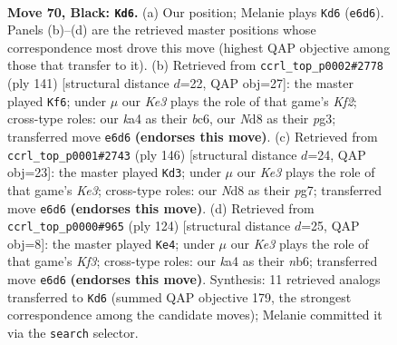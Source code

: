 \documentclass[11pt]{article}
\begin{document}
\clearpage

\begin{figure}[p]\centering
\begin{subfigure}{0.46\textwidth}\centering
\resizebox{\linewidth}{!}{%
\newchessgame
\chessboard[
  setfen={3n4/6p1/1p2k1p1/p1pp4/K7/1PP5/8/8 b - - 4 70},
  showmover=false,
  pgfstyle=straightmove, color=movearrow, markmove={e6-d6}
]}
\caption{}
\end{subfigure}\hfill
\begin{subfigure}{0.46\textwidth}\centering
\resizebox{\linewidth}{!}{%
\newchessgame
\chessboard[
  setfen={8/5k2/2B3p1/2p1pp1p/2P1p2P/4K1P1/8/8 b - - 25 71},
  showmover=false,
  pgfstyle=straightmove, color=movearrow, markmove={f7-f6}
]}
\caption{}
\end{subfigure}
\\[4pt]
\begin{subfigure}{0.46\textwidth}\centering
\resizebox{\linewidth}{!}{%
\newchessgame
\chessboard[
  setfen={8/6p1/4p3/1p1kPp1P/5P2/pP2K3/P7/8 w - - 0 74},
  showmover=false,
  pgfstyle=straightmove, color=movearrow, markmove={e3-d3}
]}
\caption{}
\end{subfigure}\hfill
\begin{subfigure}{0.46\textwidth}\centering
\resizebox{\linewidth}{!}{%
\newchessgame
\chessboard[
  setfen={8/8/1n1p1kpp/2p5/2P2PP1/5K1P/3N4/8 w - - 1 63},
  showmover=false,
  pgfstyle=straightmove, color=movearrow, markmove={f3-e4}
]}
\caption{}
\end{subfigure}
\caption{\textbf{Move 70, Black: \texttt{Kd6}.} (a) Our position; Melanie plays \texttt{Kd6} (\texttt{e6d6}). Panels (b)--(d) are the retrieved master positions whose correspondence most drove this move (highest QAP objective among those that transfer to it). (b) Retrieved from \texttt{ccrl\_top\_p0002\#2778} (ply 141) [structural distance $d$=22, QAP obj=27]: the master played \texttt{Kf6}; under $\mu$ our \emph{Ke3} plays the role of that game's \emph{Kf2}; cross-type roles: our \emph{k}a4 as their \emph{b}c6, our \emph{N}d8 as their \emph{p}g3; transferred move \texttt{e6d6} \textbf{(endorses this move)}. (c) Retrieved from \texttt{ccrl\_top\_p0001\#2743} (ply 146) [structural distance $d$=24, QAP obj=23]: the master played \texttt{Kd3}; under $\mu$ our \emph{Ke3} plays the role of that game's \emph{Ke3}; cross-type roles: our \emph{N}d8 as their \emph{p}g7; transferred move \texttt{e6d6} \textbf{(endorses this move)}. (d) Retrieved from \texttt{ccrl\_top\_p0000\#965} (ply 124) [structural distance $d$=25, QAP obj=8]: the master played \texttt{Ke4}; under $\mu$ our \emph{Ke3} plays the role of that game's \emph{Kf3}; cross-type roles: our \emph{k}a4 as their \emph{n}b6; transferred move \texttt{e6d6} \textbf{(endorses this move)}. Synthesis: 11 retrieved analogs transferred to \texttt{Kd6} (summed QAP objective 179, the strongest correspondence among the candidate moves); Melanie committed it via the \texttt{search} selector.}
\label{fig:thought-m139}
\end{figure}
\end{document}
